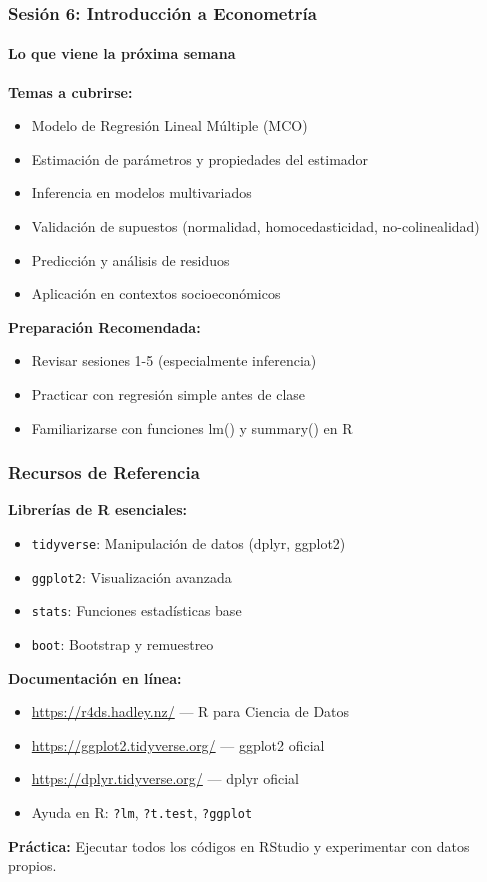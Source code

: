 \documentclass[aspectratio=169,11pt]{beamer}
\begin{document}
\begin{frame}
\frametitle{Sesión 6: Introducción a Econometría}
\framesubtitle{Lo que viene la próxima semana}
\textbf{Temas a cubrirse:}
\begin{itemize}
  \item Modelo de Regresión Lineal Múltiple (MCO)
  \item Estimación de parámetros y propiedades del estimador
  \item Inferencia en modelos multivariados
  \item Validación de supuestos (normalidad, homocedasticidad, no-colinealidad)
  \item Predicción y análisis de residuos
  \item Aplicación en contextos socioeconómicos
\end{itemize}

\vspace{0.4cm}
\textbf{Preparación Recomendada:}
\begin{itemize}
  \item Revisar sesiones 1-5 (especialmente inferencia)
  \item Practicar con regresión simple antes de clase
  \item Familiarizarse con funciones lm() y summary() en R
\end{itemize}
\end{frame}

\begin{frame}
\frametitle{Recursos de Referencia}
\textbf{Librerías de R esenciales:}
\begin{itemize}
  \item \texttt{tidyverse}: Manipulación de datos (dplyr, ggplot2)
  \item \texttt{ggplot2}: Visualización avanzada
  \item \texttt{stats}: Funciones estadísticas base
  \item \texttt{boot}: Bootstrap y remuestreo
\end{itemize}

\vspace{0.3cm}
\textbf{Documentación en línea:}
\begin{itemize}
  \item \url{https://r4ds.hadley.nz/} — R para Ciencia de Datos
  \item \url{https://ggplot2.tidyverse.org/} — ggplot2 oficial
  \item \url{https://dplyr.tidyverse.org/} — dplyr oficial
  \item Ayuda en R: \texttt{?lm}, \texttt{?t.test}, \texttt{?ggplot}
\end{itemize}

\vspace{0.3cm}
\textbf{Práctica:} Ejecutar todos los códigos en RStudio y experimentar con datos propios.
\end{frame}
\end{document}
